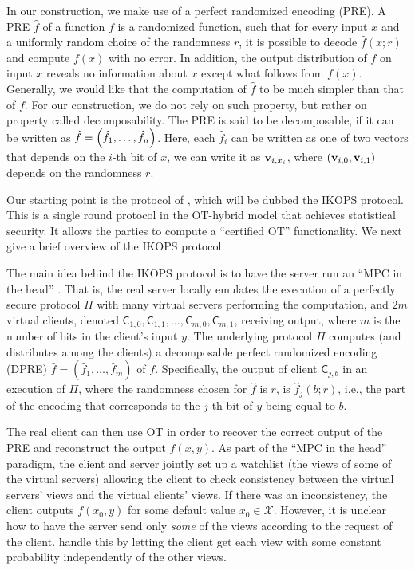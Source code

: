 \documentclass{llncs}
\newcommand{\enote}[1]{\authnote{Eran}{#1}}
\newcommand{\X}{\mathcal{X}}
\renewcommand{\v}{\myvec{v}}
\newcommand{\Cc}{\mathsf{C}}
\begin{document}
In our construction, we make use of a perfect randomized encoding (PRE). A PRE $\hat{f}$  of a function $f$ \cite{AIK04} is a randomized function, such that for every input $x$ and a uniformly random choice of the randomness $r$, it is possible to decode $\hat{f}(x;r)$ and compute $f(x)$ with no error. In addition, the output distribution of $\hat{f}$ on input $x$ reveals no information about $x$ except what follows from $f(x)$. Generally, we would like that the computation of $\hat{f}$ to be much simpler than that of $f$. For our construction, we do not rely on such property, but rather on property called decomposability. The PRE is said to be decomposable, if it can be written as $\hat{f}=\left ( \hat{f}_1,\ldots,\hat{f}_n \right )$. Here, each $\hat{f}_i$ can be written as one of two vectors that depends on the $i$-th bit of $x$, \ie we can write it as $\v_{i,x_i}$, where $(\v_{i,0},\v_{i,1})$ depends on the randomness $r$.



Our starting point is the protocol of \citet{IKOPS11}, which will be dubbed the IKOPS protocol. This is a  single round protocol in the OT-hybrid model that achieves statistical security. It allows the parties to compute a ``certified OT'' functionality. We next give a brief overview of the IKOPS protocol. 

The main idea behind the IKOPS protocol is to have the server run an ``MPC in the head'' \cite{IPS08} \enote{give citation}. That is, the real server locally emulates the execution of a perfectly secure protocol $\Pi$ with many virtual servers performing the computation, and $2m$ virtual clients, denoted $\Cc_{1,0},\Cc_{1,1},\ldots,\Cc_{m,0},\Cc_{m,1}$, receiving output, where $m$ is the number of bits in the client's input $y$. The underlying protocol $\Pi$  computes (and distributes among the clients) a decomposable perfect randomized encoding (DPRE) $\hat{f} = (\hat{f}_1,\ldots,\hat{f}_m)$ of $f$. Specifically, the output of client $\Cc_{j,b}$ in an execution of $\Pi$, where the randomness chosen for $\hat{f}$ is $r$, is $\hat{f}_j(b;r)$, i.e., the part of the encoding that corresponds to the $j$-th bit of $y$ being equal to $b$. 

The real client can then use OT in order to recover the correct output of the PRE and reconstruct the output $f(x,y)$. As part of the ``MPC in the head'' paradigm, the client and server jointly set up a watchlist (the views of some of the virtual servers) allowing the client to check consistency between the virtual servers' views and the virtual clients' views. If there was an inconsistency, the client outputs $f(x_0,y)$ for some default value $x_0\in\X$. However, it is unclear how to have the server send only \emph{some} of the views according to the request of the client. \citet{IKOPS11} handle this by letting the client get each view with some constant probability independently of the other views.
\end{document}
